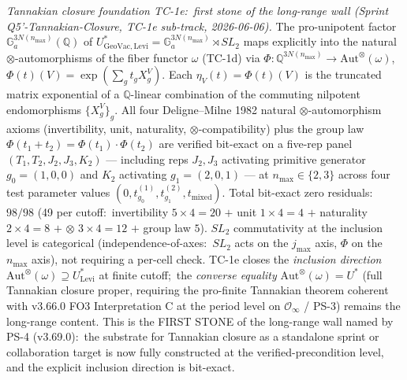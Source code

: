\documentclass[11pt,a4paper]{article}
\theoremstyle{plain}
\theoremstyle{definition}
\begin{document}
\emph{Tannakian closure foundation TC-1e:\ first stone of the
long-range wall (Sprint Q5'-Tannakian-Closure, TC-1e sub-track,
2026-06-06).}
The pro-unipotent factor $\mathbb{G}_a^{3 N(n_{\max})}(\mathbb{Q})$
of $U^*_{\mathrm{GeoVac}, \mathrm{Levi}} = \mathbb{G}_a^{3 N(n_{\max})}
\rtimes SL_2$ maps explicitly into the natural
$\otimes$-automorphisms of the fiber functor $\omega$ (TC-1d) via
$\Phi: \mathbb{Q}^{3 N(n_{\max})} \to \mathrm{Aut}^\otimes(\omega)$,
$\Phi(t)(V) = \exp(\sum_g t_g X_g^V)$.  Each
$\eta_V(t) = \Phi(t)(V)$ is the truncated matrix exponential of a
$\mathbb{Q}$-linear combination of the commuting nilpotent
endomorphisms $\{X_g^V\}_g$.  All four Deligne--Milne 1982 natural
$\otimes$-automorphism axioms (invertibility, unit, naturality,
$\otimes$-compatibility) plus the group law $\Phi(t_1 + t_2) =
\Phi(t_1) \cdot \Phi(t_2)$ are verified bit-exact on a five-rep
panel $(T_1, T_2, J_2, J_3, K_2)$ — including reps $J_2, J_3$
activating primitive generator $g_0 = (1, 0, 0)$ and $K_2$
activating $g_1 = (2, 0, 1)$ — at $n_{\max} \in \{2, 3\}$ across
four test parameter values $(0, t_{g_0}^{(1)}, t_{g_1}^{(2)},
t_{\mathrm{mixed}})$.  Total bit-exact zero residuals:\ $98 / 98$
(49 per cutoff:\ invertibility $5 \times 4 = 20$ $+$ unit
$1 \times 4 = 4$ $+$ naturality $2 \times 4 = 8$ $+$ $\otimes$
$3 \times 4 = 12$ $+$ group law $5$).  $SL_2$ commutativity at the
inclusion level is categorical (independence-of-axes:\ $SL_2$
acts on the $j_{\max}$ axis, $\Phi$ on the $n_{\max}$ axis), not
requiring a per-cell check.  TC-1e closes the \emph{inclusion
direction} $\mathrm{Aut}^\otimes(\omega) \supseteq
U^*_{\mathrm{Levi}}$ at finite cutoff;\ the \emph{converse
equality} $\mathrm{Aut}^\otimes(\omega) = U^*$ (full Tannakian
closure proper, requiring the pro-finite Tannakian theorem
coherent with v3.66.0 FO3 Interpretation C at the period level
on $\mathcal{O}_\infty$ / PS-3) remains the long-range content.
This is the FIRST STONE of the long-range wall named by PS-4
(v3.69.0):\ the substrate for Tannakian closure as a standalone
sprint or collaboration target is now fully constructed at the
verified-precondition level, and the explicit inclusion direction
is bit-exact.
\end{document}
